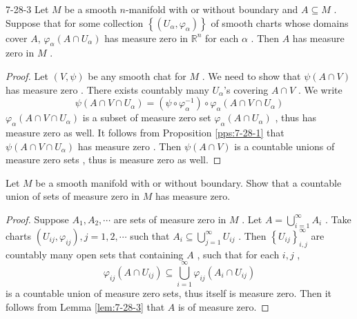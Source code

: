 \documentclass[../main.tex]{subfiles}
\begin{document}
\begin{lemma}{}{7-28-3}
    Let \(  M  \) be a smooth \(  n  \)-manifold with or without boundary and \(  A\subseteq M  \) . Suppose that for some collection \(  \left\{ \left( U_{\alpha }, \varphi _{\alpha } \right)  \right\}  \) of smooth charts whose domains cover \(  A  \), \(   \varphi _{\alpha }\left( A\cap U_{\alpha } \right)   \) has measure zero in \(  \mathbb{R} ^{n}  \) for each \(  \alpha   \) . Then \(  A  \) has measure zero in \(  M  \) .           
\end{lemma}
\begin{proof}
    Let \(  \left( V,\psi  \right)   \) be any smooth chat for \(  M  \) . We need to show that \(   \psi  \left( A\cap V \right)   \) has measure zero . There exists countably many \(  U_{\alpha }  \)'s covering \(  A\cap V  \) . We write \[
    \psi \left( A\cap V \cap U_{\alpha }\right) = \left( \psi \circ  \varphi _{\alpha }^{-1}  \right)\circ  \varphi _{\alpha }\left( A\cap V\cap U_{\alpha } \right)  
    \]  \(   \varphi _{\alpha }\left( A\cap V\cap U_{\alpha } \right)   \) is a subset of measure zero set \(   \varphi _{\alpha }\left( A\cap U_{\alpha } \right)   \) , thus has measure zero as well. It follows from Proposition \ref{pps:7-28-1} that \(  \psi \left( A\cap V\cap U_{\alpha } \right)   \) has measure zero . Then \(  \psi \left( A\cap V \right)   \) is a countable unions of measure zero sets , thus is measure zero as well.   
\end{proof}


\begin{exercise}{}{}
    Let \(  M  \) be a smooth manifold with or without boundary. Show that a countable union of sets of measure zero in \(  M  \) has measure zero.   
\end{exercise}

\begin{proof}
    Suppose \(  A_1,A_2,\cdots   \) are sets of measure zero in \(  M  \) . Let \(  A = \bigcup _{i= 1}^{\infty}A_{i}  \) . Take charts \(  \left( U_{ij}, \varphi _{ij} \right), j = 1,2,\cdots    \) such that  \(  A_{i}\subseteq  \bigcup _{j = 1}^{\infty}U_{ij}  \) .    Then \(  \left\{ U_{ij} \right\}_{i,j}^{\infty}  \) are countably many open sets that containing \(  A  \) , such that for each \(  i,j  \) ,  \[
     \varphi _{ij}\left( A\cap U_{ij} \right)\subseteq \bigcup _{i = 1}^{\infty} \varphi _{ij}\left( A_{i}\cap U_{ij} \right)  
    \]    is a countable union of measure zero sets, thus itself is measure zero. Then it follows from Lemma \ref{lem:7-28-3} that \(  A  \) is of measure zero.  
\end{proof}
\end{document}
